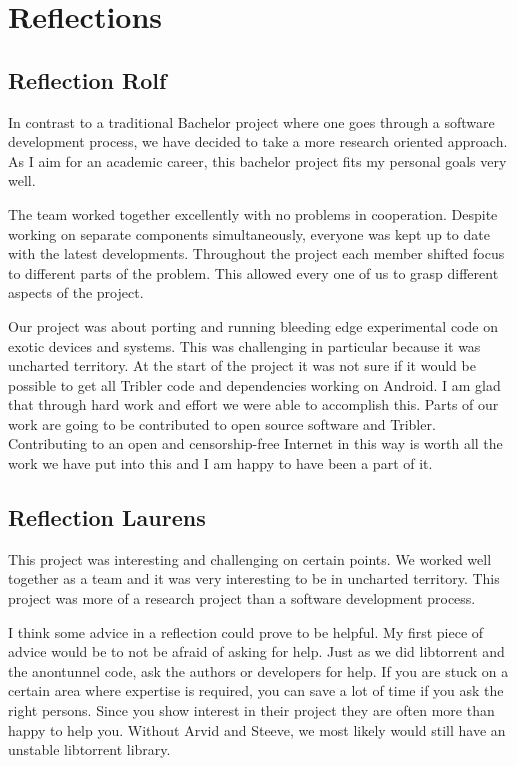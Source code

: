 	\section{Reflections}
	
		\subsection{Reflection Rolf}
			In contrast to a traditional Bachelor project where one goes through a software development process, we have decided to take a more research oriented approach. As I aim for an academic career, this bachelor project fits my personal goals very well.
		
			The team worked together excellently with no problems in cooperation. Despite working on separate components simultaneously, everyone was kept up to date with the latest developments. Throughout the project each member shifted focus to different parts of the problem. This allowed every one of us to grasp different aspects of the project.
		
			Our project was about porting and running bleeding edge experimental code on exotic devices and systems. This was challenging in particular because it was uncharted territory. At the start of the project it was not sure if it would be possible to get all Tribler code and dependencies working on Android. I am glad that through hard work and effort we were able to accomplish this. Parts of our work are going to be contributed to open source software and Tribler. Contributing to an open and censorship-free Internet in this way is worth all the work we have put into this and I am happy to have been a part of it.
		
		\subsection{Reflection Laurens}
			This project was interesting and challenging on certain points. We worked well together as a team and it was very interesting to be in uncharted territory. This project was more of a research project than a software development process.
			
			I think some advice in a reflection could prove to be helpful. My first piece of advice would be to not be afraid of asking for help.
			Just as we did libtorrent and the anontunnel code, ask the authors or developers for help. If you are stuck on a certain area where expertise is required, you can save a lot of time if you ask the right persons.
			Since you show interest in their project they are often more than happy to help you. Without Arvid and Steeve, we most likely would still have an unstable libtorrent library.
			

